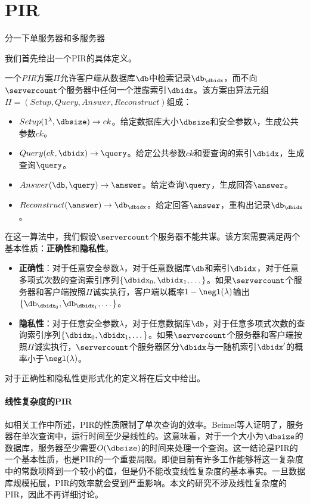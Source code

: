 \section{PIR}

{分一下单服务器和多服务器}

我们首先给出一个PIR的具体定义。

\begin{definition}[PIR]
    一个\textit{PIR}方案$\Pi$允许客户端从数据库$\db$中检索记录$\db_\dbidx$，而不向$\servercount$个服务器中任何一个泄露索引$\dbidx$。该方案由算法元组$\Pi = (Setup, Query, Answer, Reconstruct)$组成：
    \begin{itemize}[leftmargin=*]
        \item $Setup(1^\lambda,\dbsize) \rightarrow ck$。给定数据库大小$\dbsize$和安全参数$\lambda$，生成公共参数$ck$。
        \item $Query(ck, \dbidx) \rightarrow \query$。给定公共参数$ck$和要查询的索引$\dbidx$，生成查询$\query$。
        \item $Answer(\db, \query) \rightarrow \answer$。给定查询$\query$，生成回答$\answer$。
        \item $Reconstruct(\answer) \rightarrow \db_\dbidx$。给定回答$\answer$，重构出记录$\db_\dbidx$。
    \end{itemize}
    在这一算法中，我们假设$\servercount$个服务器不能共谋。该方案需要满足两个基本性质：\textbf{正确性}和\textbf{隐私性}。
    \begin{itemize}[leftmargin=*]
        \item \textbf{正确性}：对于任意安全参数$\lambda$，对于任意数据库$\db$和索引$\dbidx$，对于任意多项式次数的查询索引序列$\{\dbidx_0,\dbidx_1, \dots\}$。如果$\servercount$个服务器和客户端按照$\Pi$诚实执行，客户端以概率$1-\negl(\lambda)$输出$\{\db_{\dbidx_0},\db_{\dbidx_1}, \dots\}$。
        \item \textbf{隐私性}：对于任意安全参数$\lambda$，对于任意数据库$\db$，对于任意多项式次数的查询索引序列$\{\dbidx_0,\dbidx_1, \dots\}$。如果$\servercount$个服务器和客户端按照$\Pi$诚实执行，$\servercount$个服务器区分$\dbidx$与一随机索引$\dbidx'$的概率小于$\negl(\lambda)$。
    \end{itemize}
    对于正确性和隐私性更形式化的定义将在后文中给出。
\end{definition}

\paragraph{线性复杂度的PIR}
如相关工作中所述，PIR的性质限制了单次查询的效率。Beimel\cite{C:BeiIshMal00}等人证明了，服务器在单次查询中，运行时间至少是线性的。这意味着，对于一个大小为$\dbsize$的数据库，服务器至少需要$O(\dbsize)$的时间来处理一个查询。这一结论是PIR的一个基本性质，也是PIR的一个重要局限。即便目前有许多工作能够将这一复杂度中的常数项降到一个较小的值，但是仍不能改变线性复杂度的基本事实。一旦数据库规模拓展，PIR的效率就会受到严重影响。本文的研究不涉及线性复杂度的PIR，因此不再详细讨论。

